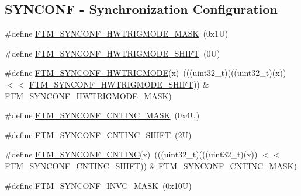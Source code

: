 \subsection*{S\+Y\+N\+C\+O\+NF -\/ Synchronization Configuration}
\begin{DoxyCompactItemize}
\item 
\#define \mbox{\hyperlink{group___f_t_m___register___masks_ga60729d222bbb0fe4e36011bd682f4f82}{F\+T\+M\+\_\+\+S\+Y\+N\+C\+O\+N\+F\+\_\+\+H\+W\+T\+R\+I\+G\+M\+O\+D\+E\+\_\+\+M\+A\+SK}}~(0x1\+U)
\item 
\#define \mbox{\hyperlink{group___f_t_m___register___masks_gaf56e2a17c8f817aa682fb4ad72873d74}{F\+T\+M\+\_\+\+S\+Y\+N\+C\+O\+N\+F\+\_\+\+H\+W\+T\+R\+I\+G\+M\+O\+D\+E\+\_\+\+S\+H\+I\+FT}}~(0\+U)
\item 
\#define \mbox{\hyperlink{group___f_t_m___register___masks_ga7a8519f25a7be7aff167cefd6e38c29c}{F\+T\+M\+\_\+\+S\+Y\+N\+C\+O\+N\+F\+\_\+\+H\+W\+T\+R\+I\+G\+M\+O\+DE}}(x)~(((uint32\+\_\+t)(((uint32\+\_\+t)(x)) $<$$<$ \mbox{\hyperlink{group___f_t_m___register___masks_gaf56e2a17c8f817aa682fb4ad72873d74}{F\+T\+M\+\_\+\+S\+Y\+N\+C\+O\+N\+F\+\_\+\+H\+W\+T\+R\+I\+G\+M\+O\+D\+E\+\_\+\+S\+H\+I\+FT}})) \& \mbox{\hyperlink{group___f_t_m___register___masks_ga60729d222bbb0fe4e36011bd682f4f82}{F\+T\+M\+\_\+\+S\+Y\+N\+C\+O\+N\+F\+\_\+\+H\+W\+T\+R\+I\+G\+M\+O\+D\+E\+\_\+\+M\+A\+SK}})
\item 
\#define \mbox{\hyperlink{group___f_t_m___register___masks_gafeaceffaaecca1ef7e96a19e21e974fb}{F\+T\+M\+\_\+\+S\+Y\+N\+C\+O\+N\+F\+\_\+\+C\+N\+T\+I\+N\+C\+\_\+\+M\+A\+SK}}~(0x4\+U)
\item 
\#define \mbox{\hyperlink{group___f_t_m___register___masks_ga44117438734ea92c0ec67dc7be294074}{F\+T\+M\+\_\+\+S\+Y\+N\+C\+O\+N\+F\+\_\+\+C\+N\+T\+I\+N\+C\+\_\+\+S\+H\+I\+FT}}~(2\+U)
\item 
\#define \mbox{\hyperlink{group___f_t_m___register___masks_ga5040b0e7f8451e0b2e7bf7414ef75fd5}{F\+T\+M\+\_\+\+S\+Y\+N\+C\+O\+N\+F\+\_\+\+C\+N\+T\+I\+NC}}(x)~(((uint32\+\_\+t)(((uint32\+\_\+t)(x)) $<$$<$ \mbox{\hyperlink{group___f_t_m___register___masks_ga44117438734ea92c0ec67dc7be294074}{F\+T\+M\+\_\+\+S\+Y\+N\+C\+O\+N\+F\+\_\+\+C\+N\+T\+I\+N\+C\+\_\+\+S\+H\+I\+FT}})) \& \mbox{\hyperlink{group___f_t_m___register___masks_gafeaceffaaecca1ef7e96a19e21e974fb}{F\+T\+M\+\_\+\+S\+Y\+N\+C\+O\+N\+F\+\_\+\+C\+N\+T\+I\+N\+C\+\_\+\+M\+A\+SK}})
\item 
\#define \mbox{\hyperlink{group___f_t_m___register___masks_ga64738e805ee6dc280986acc586530f28}{F\+T\+M\+\_\+\+S\+Y\+N\+C\+O\+N\+F\+\_\+\+I\+N\+V\+C\+\_\+\+M\+A\+SK}}~(0x10\+U)

\end{DoxyCompactItemize}
